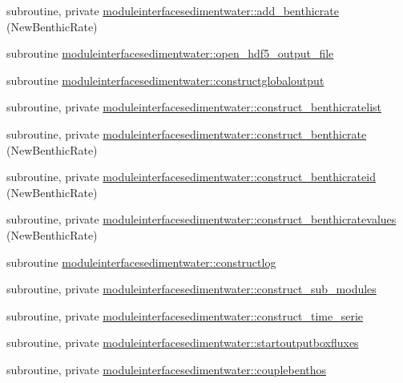 \begin{DoxyCompactItemize}
\item 
subroutine, private \mbox{\hyperlink{namespacemoduleinterfacesedimentwater_a9d88824cf037c2b56b53fc58c3274259}{moduleinterfacesedimentwater\+::add\+\_\+benthicrate}} (New\+Benthic\+Rate)
\item 
subroutine \mbox{\hyperlink{namespacemoduleinterfacesedimentwater_a4426ad3ca86030e07e39188a538bdca8}{moduleinterfacesedimentwater\+::open\+\_\+hdf5\+\_\+output\+\_\+file}}
\item 
subroutine \mbox{\hyperlink{namespacemoduleinterfacesedimentwater_ac6a2892e7ef45d76ecf31efda1d69f96}{moduleinterfacesedimentwater\+::constructglobaloutput}}
\item 
subroutine, private \mbox{\hyperlink{namespacemoduleinterfacesedimentwater_a4713df4000135a16a6b464063f75fe72}{moduleinterfacesedimentwater\+::construct\+\_\+benthicratelist}}
\item 
subroutine, private \mbox{\hyperlink{namespacemoduleinterfacesedimentwater_ab413235c8b7ada790b2fdaa8d3598925}{moduleinterfacesedimentwater\+::construct\+\_\+benthicrate}} (New\+Benthic\+Rate)
\item 
subroutine, private \mbox{\hyperlink{namespacemoduleinterfacesedimentwater_a079a9bc42bec35aabbd6e236c075228e}{moduleinterfacesedimentwater\+::construct\+\_\+benthicrateid}} (New\+Benthic\+Rate)
\item 
subroutine, private \mbox{\hyperlink{namespacemoduleinterfacesedimentwater_a6172f96194c964b013cd855127df7b8d}{moduleinterfacesedimentwater\+::construct\+\_\+benthicratevalues}} (New\+Benthic\+Rate)
\item 
subroutine \mbox{\hyperlink{namespacemoduleinterfacesedimentwater_a77697f9640e26157a55381bdf7158131}{moduleinterfacesedimentwater\+::constructlog}}
\item 
subroutine, private \mbox{\hyperlink{namespacemoduleinterfacesedimentwater_a95c6fc880171b2c2d476ac8adcb366e0}{moduleinterfacesedimentwater\+::construct\+\_\+sub\+\_\+modules}}
\item 
subroutine, private \mbox{\hyperlink{namespacemoduleinterfacesedimentwater_ad93a2c6131aefc16d45e6f81ca87678e}{moduleinterfacesedimentwater\+::construct\+\_\+time\+\_\+serie}}
\item 
subroutine, private \mbox{\hyperlink{namespacemoduleinterfacesedimentwater_af7fed6c8828bf29ad2aadce486e94d62}{moduleinterfacesedimentwater\+::startoutputboxfluxes}}
\item 
subroutine, private \mbox{\hyperlink{namespacemoduleinterfacesedimentwater_a0c508a9cfd619780e5dee7d75830b71a}{moduleinterfacesedimentwater\+::couplebenthos}}

\end{DoxyCompactItemize}
